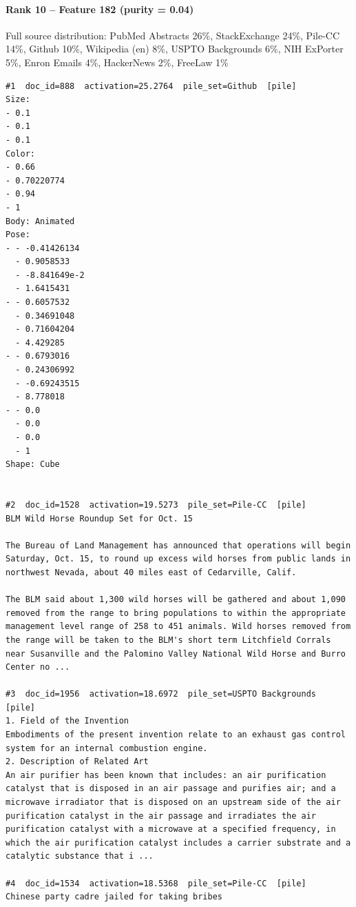 \paragraph*{Rank 10 -- Feature 182 (purity = 0.04)}

Full source distribution: PubMed Abstracts 26\%, StackExchange 24\%, Pile-CC 14\%, Github 10\%, Wikipedia (en) 8\%, USPTO Backgrounds 6\%, NIH ExPorter 5\%, Enron Emails 4\%, HackerNews 2\%, FreeLaw 1\%

\begin{verbatim}
#1  doc_id=888  activation=25.2764  pile_set=Github  [pile]
Size:
- 0.1
- 0.1
- 0.1
Color:
- 0.66
- 0.70220774
- 0.94
- 1
Body: Animated
Pose:
- - -0.41426134
  - 0.9058533
  - -8.841649e-2
  - 1.6415431
- - 0.6057532
  - 0.34691048
  - 0.71604204
  - 4.429285
- - 0.6793016
  - 0.24306992
  - -0.69243515
  - 8.778018
- - 0.0
  - 0.0
  - 0.0
  - 1
Shape: Cube


#2  doc_id=1528  activation=19.5273  pile_set=Pile-CC  [pile]
BLM Wild Horse Roundup Set for Oct. 15

The Bureau of Land Management has announced that operations will begin Saturday, Oct. 15, to round up excess wild horses from public lands in northwest Nevada, about 40 miles east of Cedarville, Calif.

The BLM said about 1,300 wild horses will be gathered and about 1,090 removed from the range to bring populations to within the appropriate management level range of 258 to 451 animals. Wild horses removed from the range will be taken to the BLM's short term Litchfield Corrals near Susanville and the Palomino Valley National Wild Horse and Burro Center no ...

#3  doc_id=1956  activation=18.6972  pile_set=USPTO Backgrounds  [pile]
1. Field of the Invention
Embodiments of the present invention relate to an exhaust gas control system for an internal combustion engine.
2. Description of Related Art
An air purifier has been known that includes: an air purification catalyst that is disposed in an air passage and purifies air; and a microwave irradiator that is disposed on an upstream side of the air purification catalyst in the air passage and irradiates the air purification catalyst with a microwave at a specified frequency, in which the air purification catalyst includes a carrier substrate and a catalytic substance that i ...

#4  doc_id=1534  activation=18.5368  pile_set=Pile-CC  [pile]
Chinese party cadre jailed for taking bribes


\end{verbatim}

